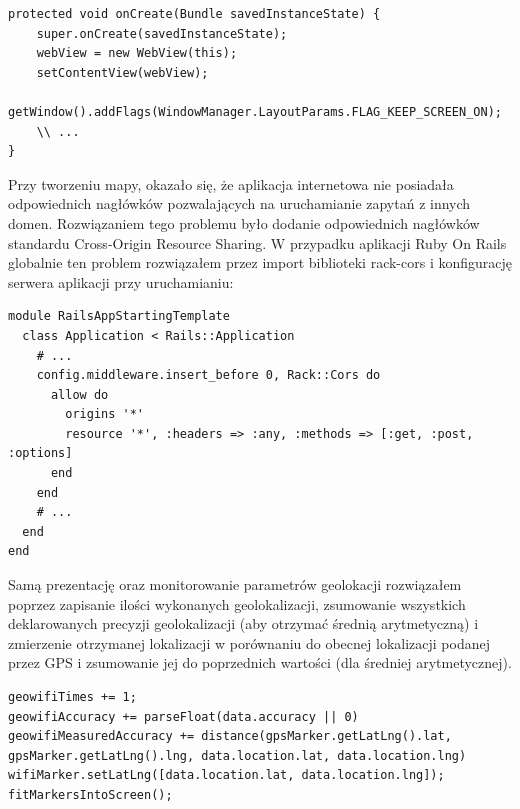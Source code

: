 \begin{verbatim}
protected void onCreate(Bundle savedInstanceState) {
    super.onCreate(savedInstanceState);
    webView = new WebView(this);
    setContentView(webView);
    getWindow().addFlags(WindowManager.LayoutParams.FLAG_KEEP_SCREEN_ON);
    \\ ...
}
\end{verbatim}

Przy tworzeniu mapy, okazało się, że aplikacja internetowa nie posiadała odpowiednich nagłówków pozwalających na uruchamianie zapytań z innych domen. Rozwiązaniem tego problemu było dodanie odpowiednich nagłówków standardu Cross-Origin Resource Sharing. W przypadku aplikacji Ruby On Rails globalnie ten problem rozwiązałem przez import biblioteki rack-cors i konfigurację serwera aplikacji przy uruchamianiu:

\begin{verbatim}
module RailsAppStartingTemplate
  class Application < Rails::Application
    # ...
    config.middleware.insert_before 0, Rack::Cors do
      allow do
        origins '*'
        resource '*', :headers => :any, :methods => [:get, :post, :options]
      end
    end
    # ...
  end
end
\end{verbatim}

Samą prezentację oraz monitorowanie parametrów geolokacji rozwiązałem poprzez zapisanie ilości wykonanych geolokalizacji, zsumowanie wszystkich deklarowanych precyzji geolokalizacji (aby otrzymać średnią arytmetyczną) i zmierzenie otrzymanej lokalizacji w porównaniu do obecnej lokalizacji podanej przez GPS i zsumowanie jej do poprzednich wartości (dla średniej arytmetycznej).

\begin{verbatim}
geowifiTimes += 1;
geowifiAccuracy += parseFloat(data.accuracy || 0)
geowifiMeasuredAccuracy += distance(gpsMarker.getLatLng().lat, gpsMarker.getLatLng().lng, data.location.lat, data.location.lng)
wifiMarker.setLatLng([data.location.lat, data.location.lng]);
fitMarkersIntoScreen();
\end{verbatim}

